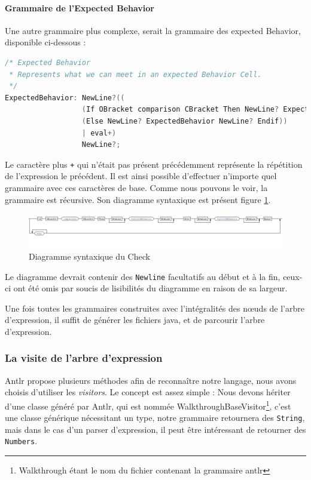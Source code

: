 		\paragraph{Grammaire de l'Expected Behavior}
		Une autre grammaire plus complexe, serait la grammaire des expected Behavior, disponible ci-dessous : 
\begin{lstlisting}[caption=Grammaire Check, numbers=none, language=C]
/* Expected Behavior 
 * Represents what we can meet in an expected Behavior Cell.
 */
ExpectedBehavior: NewLine?((
                  (If OBracket comparison CBracket Then NewLine? ExpectedBehavior NewLine?)
                  (Else NewLine? ExpectedBehavior NewLine? Endif))
                  | eval+)
                  NewLine?;
\end{lstlisting}
Le caractère plus \texttt{+} qui n'était pas présent précédemment représente la répétition de l'expression le précédent. Il est ainsi possible d'effectuer n'importe quel grammaire avec ces caractères de base. Comme nous pouvons le voir, la grammaire est récursive. Son diagramme syntaxique est présent figure \ref{fig:diagSynEB}.
\begin{figure}[H]
	\centering
		\hspace*{-40px}
	\includegraphics[width=20cm]{contents/images/ExpectedBehaviorGrammar.jpg}
	\caption{Diagramme syntaxique du Check}
	\label{fig:diagSynEB}
\end{figure}
\begin{remarque}
Le diagramme devrait contenir des \texttt{Newline} facultatifs au début et à la fin, ceux-ci ont été omis par soucis de lisibilités du diagramme en raison de sa largeur.
\end{remarque}

Une fois toutes les grammaires construites avec l'intégralités des n\oe{}uds de l'arbre d'expression, il suffit de générer les fichiers java, et de parcourir l'arbre d'expression.

	\subsubsection{La visite de l'arbre d'expression}
	Antlr propose plusieurs méthodes afin de reconnaître notre langage, nous avons choisis d'utiliser les \textit{visitors}. Le concept est assez simple : Nous devons hériter d'une classe généré par Antlr, qui est nommée WalkthroughBaseVisitor\footnote{Walkthrough étant le nom du fichier contenant la grammaire antlr}, c'est une classe générique nécessitant un type, notre grammaire retournera des \texttt{String}, mais dans le cas d'un parser d'expression, il peut être intéressant de retourner des \texttt{Numbers}.

